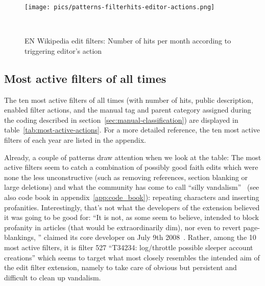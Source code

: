 \begin{figure}
\centering
  \texttt{[image: pics/patterns-filterhits-editor-actions.png]}
  \caption{EN Wikipedia edit filters: Number of hits per month according to triggering editor's action}~\label{fig:filter-hits-editors-actions}
\end{figure}

\subsection{Most active filters of all times}

The ten most active filters of all times (with number of hits, public description, enabled filter actions, and the manual tag and parent category assigned during the coding described in section~\ref{sec:manual-classification}) are displayed in table~\ref{tab:most-active-actions}.
For a more detailed reference, the ten most active filters of each year are listed in the appendix. %

Already, a couple of patterns draw attention when we look at the table:
The most active filters seem to catch a combination of possibly good faith edits which were none the less unconstructive (such as removing references, section blanking or large deletions)
and what the community has come to call ``silly vandalism''~\cite{Wikipedia:VandalismTypes} (see also code book in appendix~\ref{app:code_book}): repeating characters and inserting profanities.
Interestingly, that's not what the developers of the extension believed it was going to be good for:
``It is not, as some seem to believe, intended to block profanity in articles (that would be extraordinarily dim), nor even to revert page-blankings, '' claimed its core developer on July 9th 2008~\cite{Wikipedia:EditFilterTalkArchive1Clarification}.
Rather, among the 10 most active filters, it is filter 527 ``T34234: log/throttle possible sleeper account creations'' which seems to target what most closely resembles the intended aim of the edit filter extension, namely to take care of obvious but persistent and difficult to clean up vandalism.

